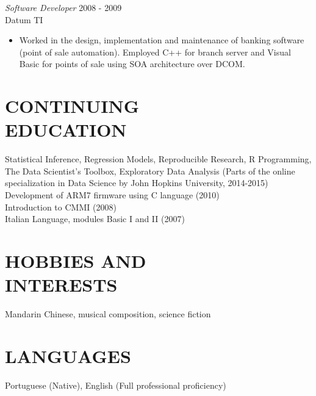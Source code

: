 \documentclass[line,margin]{res}
\begin{document}
\begin{resume}
                {\sl Software Developer} \hfill        2008 - 2009\\
                Datum TI
                  \begin{itemize}
			  \item Worked in the design, implementation and maintenance of banking software (point of sale automation). 
				  Employed C++ for branch server and Visual Basic for points of sale using SOA architecture over DCOM. 
                   \end{itemize} 
 
	\section{CONTINUING \\ EDUCATION} Statistical Inference, Regression Models, Reproducible Research, R Programming, 
                                    The Data Scientist's Toolbox, Exploratory Data Analysis 
                                    (Parts of the online specialization in Data Science by 
                                    John Hopkins University, 2014-2015)\\
                                  Development of ARM7 firmware using C language (2010) \\
                                  Introduction to CMMI (2008) \\
                                  Italian Language, modules Basic I and II (2007)

\section{HOBBIES AND \\ INTERESTS}  Mandarin Chinese, musical composition, science fiction

\section{LANGUAGES} Portuguese (Native), English (Full professional proficiency)
 
\end{resume}
\end{document}
